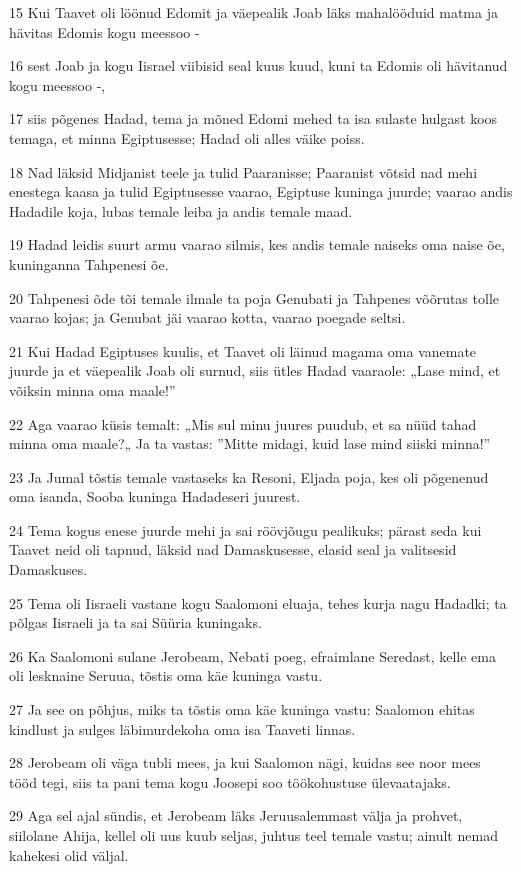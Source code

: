 \par 15 Kui Taavet oli löönud Edomit ja väepealik Joab läks mahalööduid matma ja hävitas Edomis kogu meessoo -
\par 16 sest Joab ja kogu Iisrael viibisid seal kuus kuud, kuni ta Edomis oli hävitanud kogu meessoo -,
\par 17 siis põgenes Hadad, tema ja mõned Edomi mehed ta isa sulaste hulgast koos temaga, et minna Egiptusesse; Hadad oli alles väike poiss.
\par 18 Nad läksid Midjanist teele ja tulid Paaranisse; Paaranist võtsid nad mehi enestega kaasa ja tulid Egiptusesse vaarao, Egiptuse kuninga juurde; vaarao andis Hadadile koja, lubas temale leiba ja andis temale maad.
\par 19 Hadad leidis suurt armu vaarao silmis, kes andis temale naiseks oma naise õe, kuninganna Tahpenesi õe.
\par 20 Tahpenesi õde tõi temale ilmale ta poja Genubati ja Tahpenes võõrutas tolle vaarao kojas; ja Genubat jäi vaarao kotta, vaarao poegade seltsi.
\par 21 Kui Hadad Egiptuses kuulis, et Taavet oli läinud magama oma vanemate juurde ja et väepealik Joab oli surnud, siis ütles Hadad vaaraole: „Lase mind, et võiksin minna oma maale!”
\par 22 Aga vaarao küsis temalt: „Mis sul minu juures puudub, et sa nüüd tahad minna oma maale?„ Ja ta vastas: ”Mitte midagi, kuid lase mind siiski minna!”
\par 23 Ja Jumal tõstis temale vastaseks ka Resoni, Eljada poja, kes oli põgenenud oma isanda, Sooba kuninga Hadadeseri juurest.
\par 24 Tema kogus enese juurde mehi ja sai röövjõugu pealikuks; pärast seda kui Taavet neid oli tapnud, läksid nad Damaskusesse, elasid seal ja valitsesid Damaskuses.
\par 25 Tema oli Iisraeli vastane kogu Saalomoni eluaja, tehes kurja nagu Hadadki; ta põlgas Iisraeli ja ta sai Süüria kuningaks.
\par 26 Ka Saalomoni sulane Jerobeam, Nebati poeg, efraimlane Seredast, kelle ema oli lesknaine Seruua, tõstis oma käe kuninga vastu.
\par 27 Ja see on põhjus, miks ta tõstis oma käe kuninga vastu: Saalomon ehitas kindlust ja sulges läbimurdekoha oma isa Taaveti linnas.
\par 28 Jerobeam oli väga tubli mees, ja kui Saalomon nägi, kuidas see noor mees tööd tegi, siis ta pani tema kogu Joosepi soo töökohustuse ülevaatajaks.
\par 29 Aga sel ajal sündis, et Jerobeam läks Jeruusalemmast välja ja prohvet, siilolane Ahija, kellel oli uus kuub seljas, juhtus teel temale vastu; ainult nemad kahekesi olid väljal.
